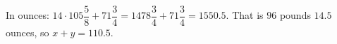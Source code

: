 In ounces: $14\cdot105\dfrac58+71\dfrac34=1478\dfrac34+71\dfrac34=1550.5$. That is $96$ pounds $14.5$ ounces, so $x+y=\boxed{110.5}$.

